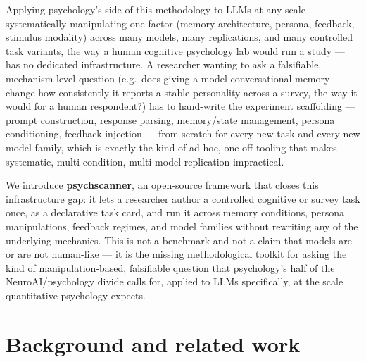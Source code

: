 \documentclass[11pt]{article}
\begin{document}
Applying psychology's side of this methodology to LLMs at any scale —
systematically manipulating one factor (memory architecture, persona,
feedback, stimulus modality) across many models, many replications, and
many controlled task variants, the way a human cognitive psychology lab
would run a study — has no dedicated infrastructure. A researcher wanting
to ask a falsifiable, mechanism-level question (e.g.\ does giving a model
conversational memory change how consistently it reports a stable
personality across a survey, the way it would for a human respondent?) has
to hand-write the experiment scaffolding — prompt construction, response
parsing, memory/state management, persona conditioning, feedback injection
— from scratch for every new task and every new model family, which is
exactly the kind of ad hoc, one-off tooling that makes systematic,
multi-condition, multi-model replication impractical.

We introduce \textbf{psychscanner}, an open-source framework that closes
this infrastructure gap: it lets a researcher author a controlled cognitive
or survey task once, as a declarative task card, and run it across
memory conditions, persona manipulations, feedback regimes, and model
families without rewriting any of the underlying mechanics. This is not a
benchmark and not a claim that models are or are not human-like — it is
the missing methodological toolkit for asking the kind of manipulation-based,
falsifiable question that psychology's half of the NeuroAI/psychology
divide calls for, applied to LLMs specifically, at the scale quantitative
psychology expects.

\section{Background and related work}
\label{sec:related}
\end{document}
